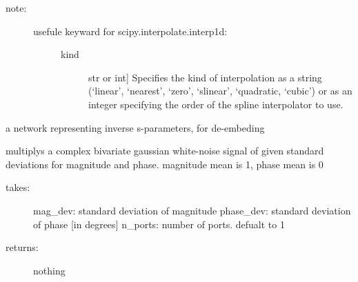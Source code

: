\documentclass[letterpaper,10pt,english]{sphinxmanual}
\begin{document}
\begin{fulllineitems}
\begin{fulllineitems}
\begin{description}
\item[{note:}] \leavevmode\begin{description}
\item[{usefule keyward for  scipy.interpolate.interp1d:}] \leavevmode\begin{description}
\item[{kind}] \leavevmode{[}str or int{]}
Specifies the kind of interpolation as a string (`linear',
`nearest', `zero', `slinear', `quadratic, `cubic') or as an integer
specifying the order of the spline interpolator to use.

\end{description}

\end{description}

\end{description}

\end{fulllineitems}


\begin{fulllineitems}
\label{auto_network:mwavepy.Network.inv}
a network representing inverse s-parameters, for de-embeding

\end{fulllineitems}


\begin{fulllineitems}
\label{auto_network:mwavepy.Network.multiply_noise}
multiplys a complex bivariate gaussian white-noise signal
of given standard deviations for magnitude and phase.   
magnitude mean is 1, phase mean is 0
\begin{description}
\item[{takes:}] \leavevmode
mag\_dev: standard deviation of magnitude
phase\_dev: standard deviation of phase {[}in degrees{]}
n\_ports: number of ports. defualt to 1

\item[{returns:}] \leavevmode
nothing

\end{description}

\end{fulllineitems}



\end{fulllineitems}
\end{document}
